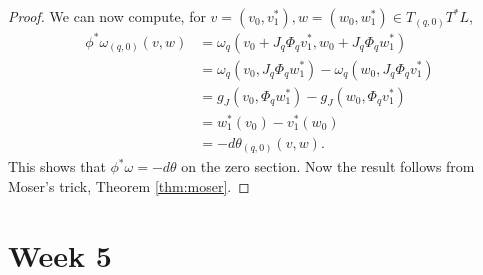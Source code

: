 \documentclass{amsart}
\begin{document}
\begin{proof}
    We can now compute, for $v=(v_0,v_1^*),w=(w_0,w_1^*)\in T_{(q,0)}T^*L$,
    \begin{align*}
        \phi^*\omega_{(q,0)}(v,w) &= \omega_q\left( v_0+J_q\Phi_qv_1^*, w_0+J_q\Phi_qw_1^* \right)\\
        &= \omega_q(v_0,J_q\Phi_qw_1^*)-\omega_q(w_0,J_q\Phi_qv_1^*)\\
        &= g_J(v_0,\Phi_qw_1^*) - g_J(w_0,\Phi_qv_1^*)\\
        &= w_1^*(v_0) - v_1^*(w_0)\\
        &= -d\theta_{(q,0)}(v,w).
    \end{align*}
    This shows that $\phi^*\omega=-d\theta$ on the zero section. Now the result follows
    from Moser's trick, Theorem \ref{thm:moser}.
\end{proof}

\newpage
\section{Week 5}
\end{document}
